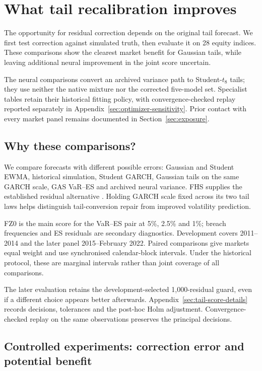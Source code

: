 \chapter{What tail recalibration improves}
\label{ch:tailresults}

The opportunity for residual correction depends on the original tail forecast. We first test correction against simulated truth, then evaluate it on 28 equity indices. These comparisons show the clearest market benefit for Gaussian tails, while leaving additional neural improvement in the joint score uncertain.

The neural comparisons convert an archived variance path to Student-$t_8$ tails; they use neither the native mixture nor the corrected five-model set. Specialist tables retain their historical fitting policy, with convergence-checked replay reported separately in Appendix~\ref{sec:optimizer-sensitivity}. Prior contact with every market panel remains documented in Section~\ref{sec:exposure}.

\section{Why these comparisons?}

We compare forecasts with different possible errors: Gaussian and Student EWMA, historical simulation, Student GARCH, Gaussian tails on the same GARCH scale, GAS VaR--ES and archived neural variance. FHS supplies the established residual alternative \citep{baroneadesi1999var,baroneadesi2008garch}. Holding GARCH scale fixed across its two tail laws helps distinguish tail-conversion repair from improved volatility prediction.

FZ0 is the main score for the VaR--ES pair at 5\%, 2.5\% and 1\%; breach frequencies and ES residuals are secondary diagnostics. Development covers 2011--2014 and the later panel 2015--February 2022. Paired comparisons give markets equal weight and use synchronised calendar-block intervals. Under the historical protocol, these are marginal intervals rather than joint coverage of all comparisons.

The later evaluation retains the development-selected 1,000-residual guard, even if a different choice appears better afterwards. Appendix~\ref{sec:tail-score-details} records decisions, tolerances and the post-hoc Holm adjustment. Convergence-checked replay on the same observations preserves the principal decisions.

\section{Controlled experiments: correction error and potential benefit}

